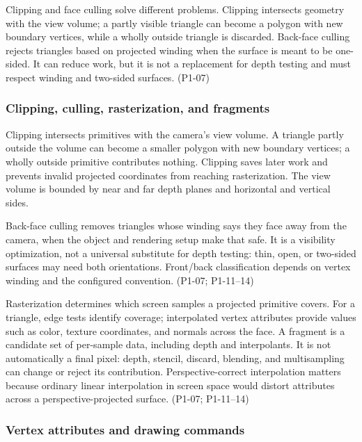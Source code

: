 Clipping and face culling solve different problems. Clipping intersects geometry with the view volume; a partly visible triangle can become a polygon with new boundary vertices, while a wholly outside triangle is discarded. Back-face culling rejects triangles based on projected winding when the surface is meant to be one-sided. It can reduce work, but it is not a replacement for depth testing and must respect winding and two-sided surfaces. (P1-07)

\subsubsection{Clipping, culling, rasterization, and fragments}\label{03-visual-computing-i-ch018-clipping-culling-rasterization-and-fragments}

Clipping intersects primitives with the camera's view volume. A triangle partly outside the volume can become a smaller polygon with new boundary vertices; a wholly outside primitive contributes nothing. Clipping saves later work and prevents invalid projected coordinates from reaching rasterization. The view volume is bounded by near and far depth planes and horizontal and vertical sides.

Back-face culling removes triangles whose winding says they face away from the camera, when the object and rendering setup make that safe. It is a visibility optimization, not a universal substitute for depth testing: thin, open, or two-sided surfaces may need both orientations. Front/back classification depends on vertex winding and the configured convention. (P1-07; P1-11--14)

Rasterization determines which screen samples a projected primitive covers. For a triangle, edge tests identify coverage; interpolated vertex attributes provide values such as color, texture coordinates, and normals across the face. A fragment is a candidate set of per-sample data, including depth and interpolants. It is not automatically a final pixel: depth, stencil, discard, blending, and multisampling can change or reject its contribution. Perspective-correct interpolation matters because ordinary linear interpolation in screen space would distort attributes across a perspective-projected surface. (P1-07; P1-11--14)

\subsubsection{Vertex attributes and drawing commands}\label{03-visual-computing-i-ch018-vertex-attributes-and-drawing-commands}

